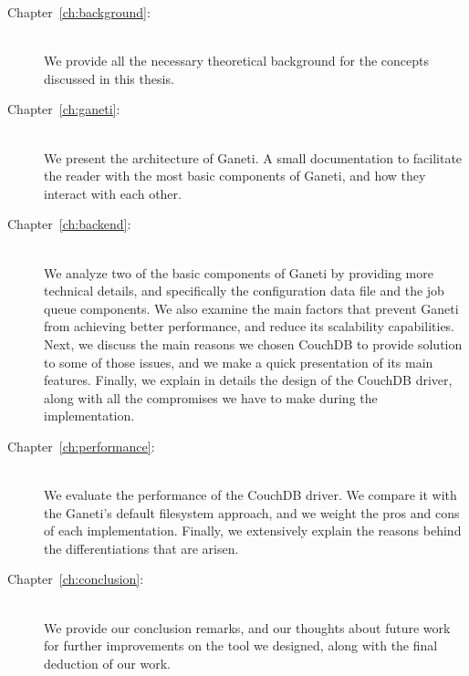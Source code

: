 \begin{description}
  \item[Chapter~\ref{ch:background}:] \hfill \\
    We provide all the necessary theoretical background for the concepts
    discussed in this thesis.
  \item[Chapter~\ref{ch:ganeti}:] \hfill \\
    We present the architecture of Ganeti. A small documentation to facilitate
    the reader with the most basic components of Ganeti, and how they interact
    with each other.
  \item[Chapter~\ref{ch:backend}:] \hfill \\
    We analyze two of the basic components of Ganeti by providing more technical
    details, and specifically the configuration data file and the job queue
    components. We also examine the main factors that prevent Ganeti from
    achieving better performance, and reduce its scalability capabilities. Next,
    we discuss the main reasons we chosen CouchDB to provide solution to some of
    those issues, and we make a quick presentation of its main features.
    Finally, we explain in details the design of the CouchDB driver, along with
    all the compromises we have to make during the implementation.
  \item[Chapter~\ref{ch:performance}:] \hfill \\
    We evaluate the performance of the CouchDB driver. We compare it with the
    Ganeti's default filesystem approach, and we weight the pros and cons of
    each implementation. Finally, we extensively explain the reasons behind the
    differentiations that are arisen.
  \item[Chapter~\ref{ch:conclusion}:] \hfill \\
    We provide our conclusion remarks, and our thoughts about future work for
    further improvements on the tool we designed, along with the final deduction
    of our work.
\end{description}
